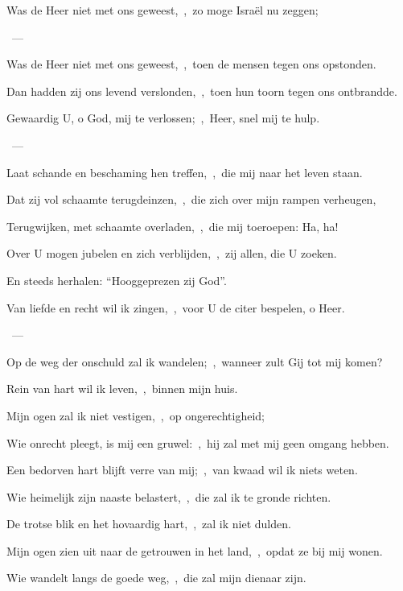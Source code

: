 \documentclass[12pt,twoside,a5paper]{article}
\begin{document}

\begin{halfparskip}
   Was de Heer niet met ons geweest,~\sep\ zo moge Israël nu zeggen;

  ~--- 

  Was de Heer niet met ons geweest,~\sep\ toen de mensen tegen ons opstonden.

  Dan hadden zij ons levend verslonden,~\sep\ toen hun toorn tegen ons ontbrandde.
\end{halfparskip}


\begin{halfparskip}
   Gewaardig U, o God, mij te verlossen;~\sep\ Heer, snel mij te hulp.

  ~--- 

  Laat schande en beschaming hen treffen,~\sep\ die mij naar het leven staan.

  Dat zij vol schaamte terugdeinzen,~\sep\ die zich over mijn rampen verheugen,

  Terugwijken, met schaamte overladen,~\sep\ die mij toeroepen: Ha, ha!

  Over U mogen jubelen en zich verblijden,~\sep\ zij allen, die U zoeken.

  En steeds herhalen: ``Hooggeprezen zij God''.
\end{halfparskip}


\begin{halfparskip}
   Van liefde en recht wil ik zingen,~\sep\ voor U de citer bespelen, o Heer.

  ~--- 

  Op de weg der onschuld zal ik wandelen;~\sep\ wanneer zult Gij tot mij komen?

  Rein van hart wil ik leven,~\sep\ binnen mijn huis.

  Mijn ogen zal ik niet vestigen,~\sep\ op ongerechtigheid;

  Wie onrecht pleegt, is mij een gruwel:~\sep\ hij zal met mij geen omgang hebben.

  Een bedorven hart blijft verre van mij;~\sep\ van kwaad wil ik niets weten.

  Wie heimelijk zijn naaste belastert,~\sep\ die zal ik te gronde richten.

  De trotse blik en het hovaardig hart,~\sep\ zal ik niet dulden.

  Mijn ogen zien uit naar de getrouwen in het land,~\sep\ opdat ze bij mij wonen.

  Wie wandelt langs de goede weg,~\sep\ die zal mijn dienaar zijn.
\end{halfparskip}
\end{document}
